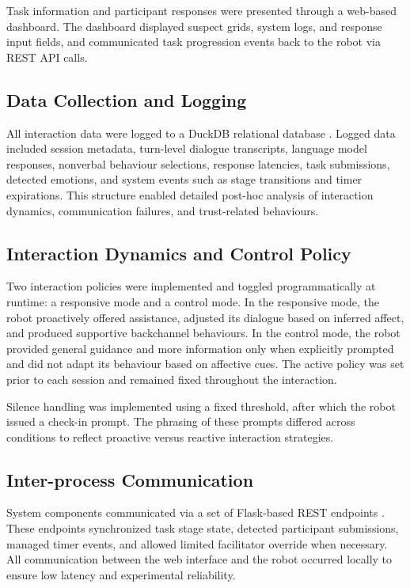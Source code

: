 \documentclass[
]{article}
\begin{document}
Task information and participant responses were presented through a
web-based dashboard. The dashboard displayed suspect grids, system logs,
and response input fields, and communicated task progression events back
to the robot via REST API calls.

\subsection{Data Collection and
Logging}\label{data-collection-and-logging}

All interaction data were logged to a DuckDB relational database
\autocite{duckdb2026}. Logged data included session metadata, turn-level
dialogue transcripts, language model responses, nonverbal behaviour
selections, response latencies, task submissions, detected emotions, and
system events such as stage transitions and timer expirations. This
structure enabled detailed post-hoc analysis of interaction dynamics,
communication failures, and trust-related behaviours.

\subsection{Interaction Dynamics and Control
Policy}\label{interaction-dynamics-and-control-policy}

Two interaction policies were implemented and toggled programmatically
at runtime: a responsive mode and a control mode. In the responsive
mode, the robot proactively offered assistance, adjusted its dialogue
based on inferred affect, and produced supportive backchannel
behaviours. In the control mode, the robot provided general guidance and
more information only when explicitly prompted and did not adapt its
behaviour based on affective cues. The active policy was set prior to
each session and remained fixed throughout the interaction.

Silence handling was implemented using a fixed threshold, after which
the robot issued a check-in prompt. The phrasing of these prompts
differed across conditions to reflect proactive versus reactive
interaction strategies.

\subsection{Inter-process
Communication}\label{inter-process-communication}

System components communicated via a set of Flask-based REST endpoints
\autocite{pallets2024flask}. These endpoints synchronized task stage
state, detected participant submissions, managed timer events, and
allowed limited facilitator override when necessary. All communication
between the web interface and the robot occurred locally to ensure low
latency and experimental reliability.
\end{document}
